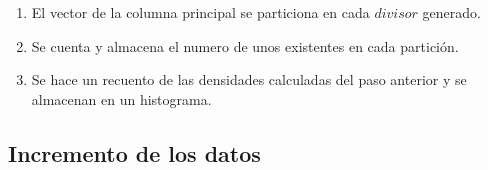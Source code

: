 \documentclass[12pt,twoside]{article}
\begin{document}
	\begin{enumerate}
		\item El vector de la columna principal se particiona en cada $divisor$ generado.
		\item Se cuenta y almacena el numero de unos existentes en cada partición.
		\item Se hace un recuento de las densidades calculadas del paso anterior y se almacenan en un histograma.
	\end{enumerate}
	
	\subsection{Incremento de los datos}
	
	
	
	\clearpage
\end{document}
